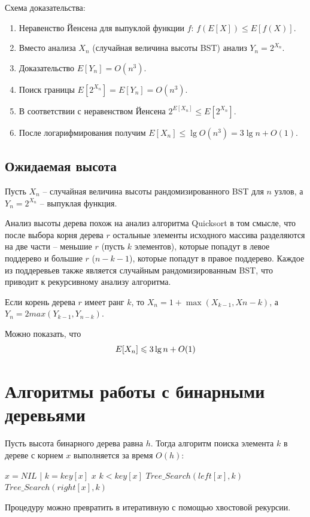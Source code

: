 \documentclass[11pt]{article}
\begin{document}
Схема доказательства:
\begin{enumerate}
\item Неравенство Йенсена для выпуклой функции $f$: $f(E[X]) \leqslant E[f(X)]$.
\item Вместо анализа $X_n$ (случайная величина высоты BST) анализ
  $Y_n = 2^{X_n}$.
\item Доказательство $E[Y_n] = O(n^3)$.
\item Поиск границы $E[2^{X_n}] = E[Y_n] = O(n^3)$.
\item В соответствии с неравенством Йенсена $2^{E[X_n]} \leqslant E[2^{X_n}]$.
\item После логарифмирования получим $E[X_n] \leqslant \lg O(n^3) = 3\lg n +
  O(1)$.
\end{enumerate}

\subsection{Ожидаемая высота}
Пусть $X_n$ -- случайная величина высоты рандомизированного BST для $n$ узлов,
а $Y_n = 2^{X_n}$ -- выпуклая функция.

Анализ высоты дерева похож на анализ алгоритма Quicksort в том смысле, что после
выбора корня дерева $r$ остальные элементы исходного массива разделяются на две
части -- меньшие $r$ (пусть $k$ элементов), которые попадут в левое поддерево и
большие $r$ ($n - k - 1$), которые попадут в правое поддерево. Каждое из
поддеревьев также является случайным рандомизированным BST, что приводит к
рекурсивному анализу алгоритма.

Если корень дерева $r$ имеет ранг $k$, то $X_n = 1 + \max(X_{k-1}, X{n-k})$,
а $Y_n = 2max(Y_{k-1}, Y_{n-k})$.

Можно показать, что 
\begin{equation*}
  E[X_n] \leqslant 3 \lg n + O(1) \\  
\end{equation*}

\section{Алгоритмы работы с бинарными деревьями}
Пусть высота бинарного дерева равна $h$. Тогда алгоритм поиска элемента
$k$ в дереве с корнем $x$ выполняется за время $O(h)$:
\begin{codebox}
\li \If $x = NIL$ | $k = key[x]$
\li \Then \Return $x$
\End
\li \If $k < key[x]$
\li \Then \Return $Tree\_Search(left[x], k)$
\li \Else \Return $Tree\_Search(right[x], k)$
\End
\end{codebox}
Процедуру можно превратить в итеративную с помощью хвостовой рекурсии.
\end{document}
